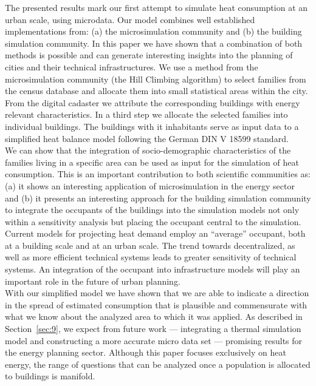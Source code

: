 \documentclass[11pt]{IJM-article}
\begin{document}
The presented results mark our first attempt to simulate heat consumption at an
urban scale, using microdata. Our model combines well established
implementations from: (a) the microsimulation community and (b) the building
simulation community. In this paper we have shown that a combination of both
methods is possible and can generate interesting insights into the planning of
cities and their technical infrastructures. We use a method from the
microsimulation community (the Hill Climbing algorithm) to select families from
the census database and allocate them into small statistical areas within the
city. From the digital cadaster we attribute the corresponding buildings with
energy relevant characteristics. In a third step we allocate the selected
families into individual buildings. The buildings with it inhabitants serve as
input data to a simplified heat balance model following the German DIN V 18599
standard.\\

We can show that the integration of socio-demographic characteristics of the
families living in a specific area can be used as input for the simulation of
heat consumption. This is an important contribution to both scientific
communities as: (a) it shows an interesting application of microsimulation in
the energy sector and (b) it presents an interesting approach for the building
simulation community to integrate the occupants of the buildings into the
simulation models not only within a sensitivity analysis but placing the
occupant central to the simulation.  Current models for projecting heat demand
employ an ``average'' occupant, both at a building scale and at an urban scale.
The trend towards decentralized, as well as more efficient technical systems
leads to greater sensitivity of technical systems. An integration of the
occupant into infrastructure models will play an important role in the future
of urban planning.\\

With our simplified model we have shown that we are able to indicate a
direction in the spread of estimated consumption that is plausible and
commensurate with what we know about the analyzed area to which it was applied.
As described in Section~\ref{sec:9}, we expect from future work --- integrating
a thermal simulation model and constructing a more accurate micro data set ---
promising results for the energy planning sector. Although this paper focuses
exclusively on heat energy, the range of questions that can be analyzed once a
population is allocated to buildings is manifold.\\
\end{document}
